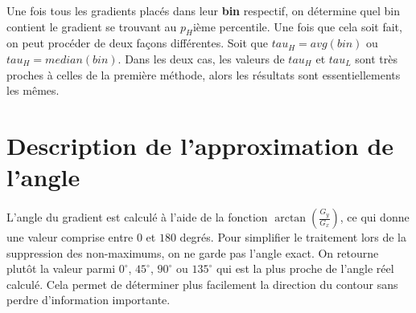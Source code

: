 \documentclass{article}
\begin{document}
Une fois tous les gradients placés dans leur \textbf{bin} respectif, on détermine quel bin contient
le gradient se trouvant au $p_H$ième percentile. Une fois que cela soit fait, on peut procéder de deux façons différentes. Soit que $tau_H = avg(bin)$ ou 
$tau_H = median(bin)$. Dans les deux cas, les valeurs de $tau_H$ et $tau_L$ sont très proches à celles de la première méthode, alors les résultats sont 
essentiellements les mêmes.


\section*{Description de l’approximation de l’angle}

L’angle du gradient est calculé à l’aide de la fonction \(\arctan\left(\frac{G_y}{G_x}\right)\), ce qui donne une valeur comprise entre \(0\) et \(180\) degrés.  
Pour simplifier le traitement lors de la suppression des non-maximums, on ne garde pas l’angle exact.  
On retourne plutôt la valeur parmi \(0^\circ\), \(45^\circ\), \(90^\circ\) ou \(135^\circ\) qui est la plus proche de l’angle réel calculé.  
Cela permet de déterminer plus facilement la direction du contour sans perdre d’information importante.
\end{document}
